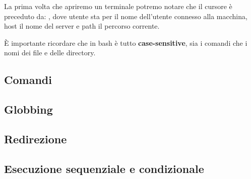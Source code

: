 \documentclass[../main.tex]{subfiles}
\begin{document}
La prima volta che apriremo un terminale potremo notare che il cursore è preceduto da: , dove utente sta per il nome dell'utente connesso alla macchina, host il nome del server e path il percorso corrente.

È importante ricordare che in bash è tutto \textbf{case-sensitive}, sia i comandi che i nomi dei file e delle directory.

\subsection{Comandi}


\subsection{Globbing}


\subsection{Redirezione}


\subsection{Esecuzione sequenziale e condizionale}

\end{document}
